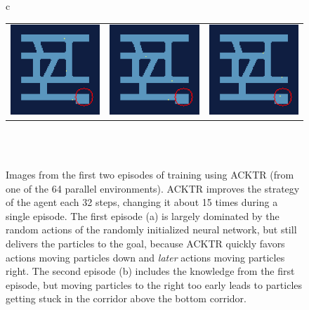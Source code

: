 \begin{figure} [htp]
\begin{center}
\begin{tabular}{c}
\begin{tabular}{ccc}
                \addlinespace[0.2cm]
                \includegraphics[width=0.25\columnwidth]{figures/evaluation/algorithms/training_example/acktr/51_k.png} &
                \includegraphics[width=0.25\columnwidth]{figures/evaluation/algorithms/training_example/acktr/58_k.png} & 
                \includegraphics[width=0.25\columnwidth]{figures/evaluation/algorithms/training_example/acktr/65_k.png} \\
            \end{tabular} \\
             \\
        \end{tabular}
    \end{center}
    \caption[Images During Training Episodes with ACKTR]{Images from the first two episodes of training using ACKTR (from one of the 64 parallel environments). ACKTR improves the strategy of the agent each 32 steps, changing it about 15 times during a single episode. The first episode (a) is largely dominated by the random actions of the randomly initialized neural network, but still delivers the particles to the goal, because ACKTR quickly favors actions moving particles down and \textit{later} actions moving particles right. The second episode (b) includes the knowledge from the first episode, but moving particles to the right too early leads to particles getting stuck in the corridor above the bottom corridor.} \label{fig:AcktrTrainingEpisodes}
\end{figure}


